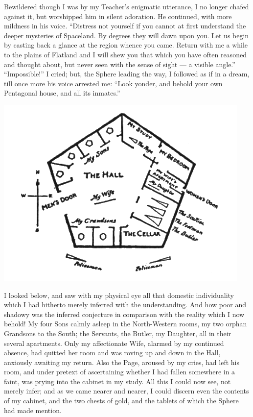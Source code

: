 \documentclass[12pt, a4paper, twoside]{memoir}
\begin{document}
Bewildered though I was by my Teacher's enigmatic utterance, I no longer
chafed against it, but worshipped him in silent adoration. He continued, with
more mildness in his voice. ``Distress not yourself if you cannot at first
understand the deeper mysteries of Spaceland. By degrees they will dawn upon
you. Let us begin by casting back a glance at the region whence you came.
Return with me a while to the plains of Flatland and I will shew you that
which you have often reasoned and thought about, but never seen with the sense
of sight --- a visible angle.'' ``Impossible!'' I cried; but, the Sphere leading
the way, I followed as if in a dream, till once more his voice arrested me:
``Look yonder, and behold your own Pentagonal house, and all its inmates.''
\begin{center}
\includegraphics[trim=20mm 0mm 20mm 0mm,scale=0.7]{fig9}
\end{center}


I looked below, and saw with my physical eye all that domestic individuality
which I had hitherto merely inferred with the understanding. And how poor and
shadowy was the inferred conjecture in comparison with the reality which I now
behold! My four Sons calmly asleep in the North-Western rooms, my two orphan
Grandsons to the South; the Servants, the Butler, my Daughter, all in their
several apartments. Only my affectionate Wife, alarmed by my continued
absence, had quitted her room and was roving up and down in the Hall,
anxiously awaiting my return. Also the Page, aroused by my cries, had left his
room, and under pretext of ascertaining whether I had fallen somewhere in a
faint, was prying into the cabinet in my study. All this I could now see, not
merely infer; and as we came nearer and nearer, I could discern even the
contents of my cabinet, and the two chests of gold, and the tablets of which
the Sphere had made mention.
\end{document}

